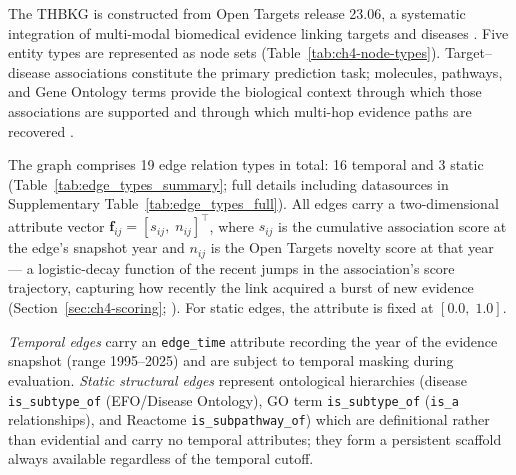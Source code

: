 \documentclass[a4,center]{NAR}
\begin{document}
{The THBKG is constructed from Open Targets release 23.06, a systematic
integration of multi-modal biomedical evidence linking targets and diseases
\citep{Ochoa2021OpenPrioritisation}. Five entity types are represented as node sets
(Table~\ref{tab:ch4-node-types}). Target--disease associations constitute
the primary prediction task; molecules, pathways, and Gene Ontology terms
provide the biological context through which those associations are
supported and through which multi-hop evidence paths are recovered
\citep{Narganes-Carlon2024GATher:Links}.

\begin{table}[h]
\end{table}

The graph comprises 19 edge relation types in total: 16 temporal and
3 static (Table~\ref{tab:edge_types_summary}; full details including
datasources in Supplementary Table~\ref{tab:edge_types_full}). All edges
carry a two-dimensional attribute vector
$\mathbf{f}_{ij} = [s_{ij},\; n_{ij}]^\top$, where $s_{ij}$ is the
cumulative association score at the edge's snapshot year and $n_{ij}$ is
the Open Targets novelty score at that year --- a logistic-decay function
of the recent jumps in the association's score trajectory, capturing how
recently the link acquired a burst of new evidence
(Section~\ref{sec:ch4-scoring}; \citealp{Falaguera2025TemporalDiscovery}).
For static edges, the attribute is fixed at $[0.0,\; 1.0]$.

\emph{Temporal edges} carry an \texttt{edge\_time} attribute recording the
year of the evidence snapshot (range 1995--2025) and are subject to temporal
masking during evaluation. \emph{Static structural edges} represent
ontological hierarchies (disease \texttt{is\_subtype\_of} (EFO/Disease
Ontology), GO term \texttt{is\_subtype\_of} (\texttt{is\_a} relationships),
and Reactome \texttt{is\_subpathway\_of}) which are definitional rather
than evidential and carry no temporal attributes; they form a persistent
scaffold always available regardless of the temporal cutoff.

}
\end{document}
